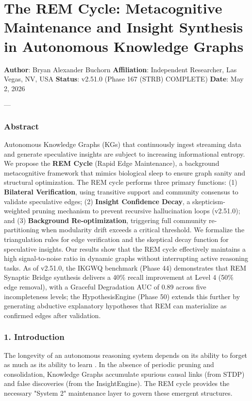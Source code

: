 \section{The REM Cycle: Metaco\-gnitive Maintenance and Insight Synthesis in Autonomous Knowledge Graphs}

\textbf{Author}: Bryan Alexander Buchorn  
\textbf{Affiliation}: Independent Researcher, Las Vegas, NV, USA  
\textbf{Status}: v2.51.0 (Phase 167 (STRB) COMPLETE)
\textbf{Date}: May 2, 2026

---

\subsubsection{Abstract}
Autonomous Knowledge Graphs (KGs) that conti\-nuously ingest streaming data and generate speculative insights are subject to increasing infor\-mational entropy. We propose the \textbf{REM Cycle} (Rapid Edge Maintenance), a background metac\-ognitive framework that mimics biological sleep to ensure graph sanity and structural optim\-ization. The REM cycle performs three primary functions: (1) \textbf{Bilateral Verifi\-cation}, using transitive support and community consensus to validate speculative edges; (2) \textbf{Insight Confidence Decay}, a skepticism-weighted pruning mechanism to prevent recursive hallu\-cination loops (v2.51.0); and (3) \textbf{Background Re-optim\-ization}, triggering full community re-parti\-tioning when modularity drift exceeds a critical threshold. We formalize the trian\-gulation rules for edge verif\-ication and the skeptical decay function for speculative insights. Our results show that the REM cycle effectively maintains a high signal-to-noise ratio in dynamic graphs without inter\-rupting active reasoning tasks. As of v2.51.0, the IKGWQ benchmark (Phase 44) demon\-strates that REM Synaptic Bridge synthesis delivers a 40\% recall improvement at Level 4 (50\% edge removal), with a Graceful Degradation AUC of 0.89 across five incom\-pleteness levels; the HypothesisEngine (Phase 50) extends this further by generating abductive explanatory hypotheses that REM can materialize as confirmed edges after validation.

\subsubsection{1. Introd\-uction}
The longevity of an autonomous reasoning system depends on its ability to forget as much as its ability to learn \cite{diekelmann2010memory}. In the absence of periodic pruning and conso\-lidation, Knowledge Graphs accumulate spurious causal links (from STDP) and false discoveries (from the InsightEngine). The REM cycle provides the necessary "System 2" maintenance layer to govern these emergent structures.


